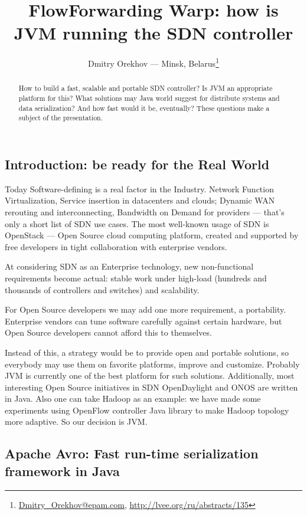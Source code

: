 \documentclass[10pt, a5paper]{article}
\begin{document}
\title{FlowForwarding Warp: how is JVM running the SDN controller}
\author{Dmitry Orekhov --- Minsk, Belarus\footnote{\url{Dmitry_Orekhov@epam.com}, \url{http://lvee.org/ru/abstracts/135}}}
\maketitle
\begin{abstract}
How to build a fast, scalable and portable SDN controller? Is JVM an appropriate platform for this? What solutions may Java world suggest for distribute systems and data serialization? And how fast would it be, eventually?
These questions make a subject of the presentation.
\end{abstract}
\subsection*{Introduction: be ready for the Real World}

Today Software-defining is a real factor in the Industry. Network Function Virtualization, Service insertion in datacenters and clouds; Dynamic WAN rerouting and interconnecting, Bandwidth on Demand for providers --- that's only a short list of SDN use cases. The most well-known usage of SDN is OpenStack --- Open Source cloud computing platform, created and supported by free developers in tight collaboration with enterprise vendors.

At considering SDN as an Enterprise technology, new non-functional requirements become actual: stable work under high-load (hundreds and thousands of controllers and switches) and scalability.

For Open Source developers we may add one more requirement, a portability. Enterprise vendors can tune software carefully against certain hardware, but Open Source developers cannot afford this to themselves.

Instead of this, a strategy would be to provide open and portable solutions, so everybody may use them on favorite platforms, improve and customize. Probably JVM is currently one of the best platform for such solutions. 
Additionally, most interesting Open Source initiatives in SDN OpenDaylight and ONOS are written in Java. Also one can take Hadoop as an example: we have made some experiments using OpenFlow controller Java library to make Hadoop topology more adap\-tive. 
So our decision is JVM.

\subsection*{Apache Avro: Fast run-time serialization framework in Java}
\end{document}

